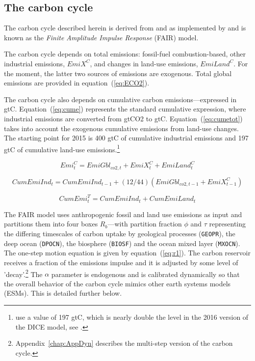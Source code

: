 \subsection{The carbon cycle}

The carbon cycle described herein is derived
from \cite{MillaretalACP2017} and \cite{SmithetalGMD2018}
as implemented by \cite{Haensel2020} and 
is known as the \emph{Finite Amplitude Impulse Response} (FAIR) model. 

The carbon cycle depends on total \COT{} emissions:
fossil-fuel combustion-based, other industrial \COT{} emissions, $\mathit{EmiX}^C$,
and changes in land-use emissions, $\mathit{EmiLand}^C$. For
the moment, the latter two sources of \COT{} emissions are
exogenous. Total global \COT{} emissions are provided
in equation~(\ref{eq:ECO2}). 

The carbon cycle also depends
on cumulative carbon emissions---expressed in gtC.
Equation~(\ref{eq:cume}) represents the standard
cumulative expression, where industrial emissions
are converted from gtCO2 to gtC.
Equation~(\ref{eq:cumetot}) takes into account
the exogenous cumulative emissions from land-use changes.
The starting point for 2015 is 400 gtC of cumulative
industrial emissions and 197 gtC of cumulative land-use
emissions.\footnote{\cite{Haensel2020} use a value of 197 gtC, which
is nearly double the level in the 2016 version of the DICE model, see
\cite{Nordhaus2016NBERw22933}.}

\begin{equation}
\label{eq:ECO2}
\mathit{Emi}^C_t = \mathit{EmiGbl}_{\mathit{co2},t}
 + \mathit{EmiX}^C_t + \mathit{EmiLand}^C_t
\end{equation}

\begin{equation}
\label{eq:cume}
\mathit{CumEmiInd}_t = \mathit{CumEmiInd}_{t-1} 
+ (12/44) \left(\mathit{EmiGbl}_{\mathit{co2},t-1}
 + \mathit{EmiX}^C_{t-1} \right)
\end{equation}

\begin{equation}
\label{eq:cumetot}
\mathit{CumEmi}^T_t = \mathit{CumEmiInd}_t + \mathit{CumEmiLand}_t
\end{equation}

The FAIR model uses anthropogenic fossil and land use \COT{}
emissions as input and partitions them into four boxes $R_b$---with
partition fraction $\phi$ and $\tau$ representing the
differing timescales of carbon uptake by geological processes
(\texttt{GEOPR}), the deep ocean (\texttt{DPOCN}), the biosphere (\texttt{BIOSF}) and the ocean
mixed layer (\texttt{MXOCN}). The one-step motion equation
is given by equation~(\ref{eq:r1}). The carbon reservoir receives a
fraction of the \COT{} emissions impulse and it is adjusted by some
level of 'decay'.\footnote{Appendix~\ref{chap:AppDyn} describes
the multi-step version of the carbon cycle.}
The $\alpha$ parameter is endogenous and is calibrated dynamically so
that the overall behavior of the carbon cycle mimics other earth systems models (ESMs). This is detailed further below.


